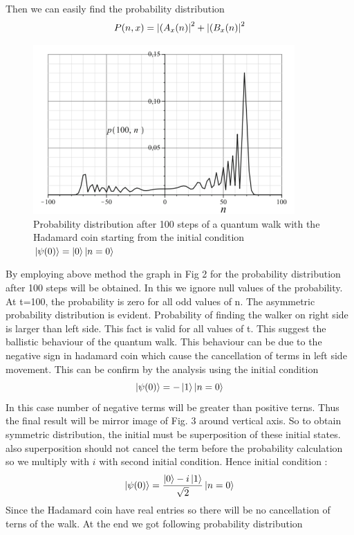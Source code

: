 \documentclass[11 pt]{article}
\theoremstyle{definition}
\theoremstyle{remark}
\newcommand{\di}{i}
\begin{document}
Then we can easily find the probability distribution
$$ P(n,x) = \abs{(A_{x}(n)}^2 + \abs{(B_{x}(n)}^2 $$

\begin{figure}[htp]
    \centering
    \includegraphics[width = 10cm]{Line_Graph.png}
    \caption{Probability distribution after 100 steps of a quantum walk with the Hadamard coin starting from the initial condition $\ket{\psi(0)} = \ket{0}\ket{n=0}$}
\end{figure}
By employing above method the graph in Fig 2 for the probability distribution after 100 steps will be obtained. In this we ignore null values of the probability. At t=100, the probability is zero for all odd values of n. The asymmetric probability distribution is evident. Probability of finding the walker on right side is larger than left side. This fact is valid for all values of t. This suggest the ballistic behaviour of the quantum walk. This behaviour can be due to the negative sign in hadamard coin which cause the cancellation of terms in left side movement. This can be confirm by the analysis using the initial condition $$\ket{\psi(0)} = -\ket{1}\ket{n=0}$$ 
In this case number of negative terms will be greater than positive terns. Thus the final result will be mirror image of Fig. 3 around vertical axis. So to obtain symmetric distribution, the initial must be superposition of these initial states. also superposition should not cancel the term before the probability calculation so we multiply with $\di$ with second initial condition. Hence initial condition :$$\ket{\psi(0)} = \dfrac{\ket{0}- \di\ket{1}}{\sqrt{2}}\ket{n=0}$$
Since the Hadamard coin have real entries so there will be no cancellation of terns of the walk. At the end we got following probability distribution   
\end{document}
